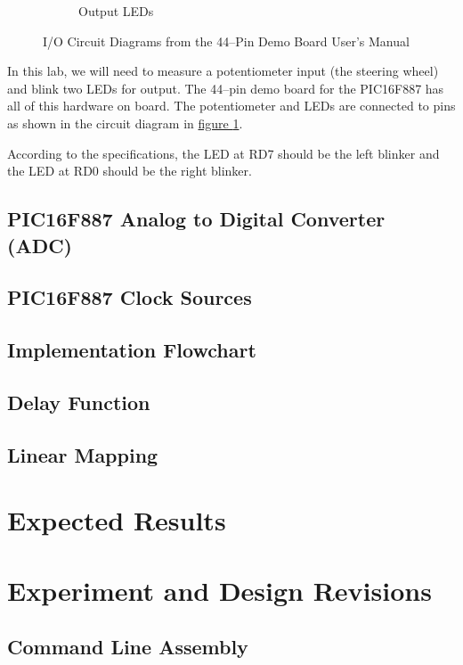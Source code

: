 \documentclass[11pt]{article}
\begin{document}
\begin{figure}
\begin{subfigure}[b]{0.3\textwidth}
		\caption[]%
		{{Output LEDs}}
	\end{subfigure}	
	\caption{I/O Circuit Diagrams from the 44--Pin Demo Board User's Manual}
	\label{io-circuit-diagram}
\end{figure}

In this lab, we will need to measure a potentiometer input (the steering wheel)
and blink two LEDs for output. The 44--pin demo board for the PIC16F887
has all of this hardware on board. The potentiometer and LEDs are connected to
pins as shown in the circuit diagram in
\hyperref[io-circuit-diagram]{figure \ref{io-circuit-diagram}}.

According to the specifications, the LED at RD7 should be the left blinker
and the LED at RD0 should be the right blinker.

\subsection{PIC16F887 Analog to Digital Converter (ADC)}



\subsection{PIC16F887 Clock Sources}

\subsection{Implementation Flowchart}

\subsection{Delay Function}

\subsection{Linear Mapping}

\section{Expected Results}

\section{Experiment and Design Revisions}

\subsection{Command Line Assembly}
\end{document}
